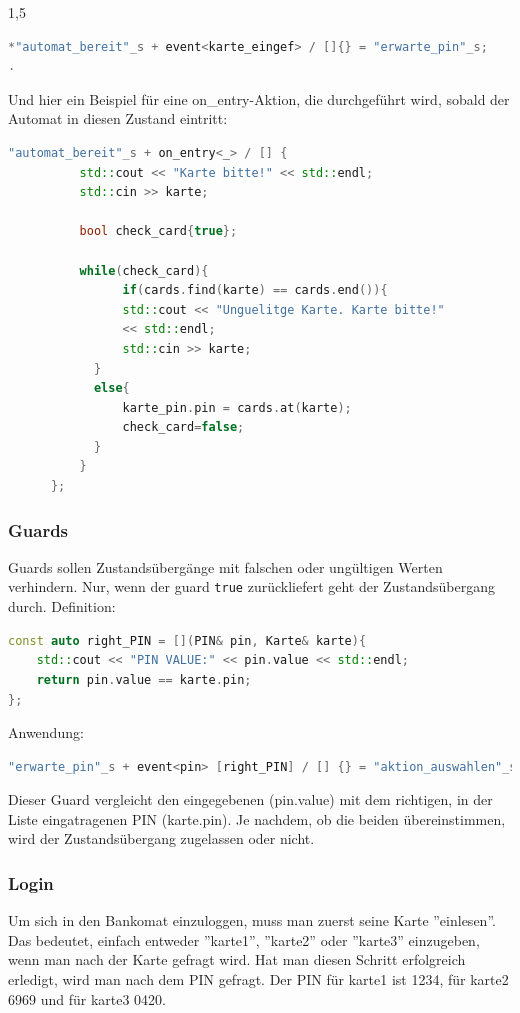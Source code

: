 \documentclass[a4paper]{article}
\begin{document}
\begin{spacing}{1,5}
\begin{lstlisting}[language=c++]
*"automat_bereit"_s + event<karte_eingef> / []{} = "erwarte_pin"_s;
.
\end{lstlisting}
Und hier ein Beispiel für eine on\_entry-Aktion, die durchgeführt wird, sobald der Automat in diesen Zustand eintritt:
\begin{lstlisting}[language=c++]
"automat_bereit"_s + on_entry<_> / [] {
          std::cout << "Karte bitte!" << std::endl;
          std::cin >> karte;

          bool check_card{true};

          while(check_card){
                if(cards.find(karte) == cards.end()){
                std::cout << "Unguelitge Karte. Karte bitte!"
                << std::endl;
                std::cin >> karte;
            }
            else{
                karte_pin.pin = cards.at(karte);
                check_card=false;
            }
          }      
      };
\end{lstlisting}

\subsubsection{Guards}

Guards sollen Zustandsübergänge mit falschen oder ungültigen Werten verhindern. Nur, wenn der guard \texttt{true} zurückliefert geht der Zustandsübergang durch.\newline\newline
Definition:
\begin{lstlisting}[language=c++]
const auto right_PIN = [](PIN& pin, Karte& karte){
    std::cout << "PIN VALUE:" << pin.value << std::endl;
    return pin.value == karte.pin;
};
\end{lstlisting}
Anwendung:

\begin{lstlisting}[language=c++]
"erwarte_pin"_s + event<pin> [right_PIN] / [] {} = "aktion_auswahlen"_s;
\end{lstlisting}
Dieser Guard vergleicht den eingegebenen (pin.value)
 mit dem richtigen, in der Liste eingatragenen PIN (karte.pin). Je nachdem, ob die beiden übereinstimmen, wird der Zustandsübergang zugelassen oder nicht.

\subsubsection{Login}

Um sich in den Bankomat einzuloggen, muss man zuerst seine Karte ''einlesen''. Das bedeutet, einfach entweder ''karte1'', ''karte2'' oder ''karte3'' einzugeben, wenn man nach der Karte gefragt wird. Hat man diesen Schritt erfolgreich erledigt, wird man nach dem PIN gefragt. Der PIN für karte1 ist 1234, für karte2 6969 und für karte3 0420.


\end{spacing}
\end{document}

